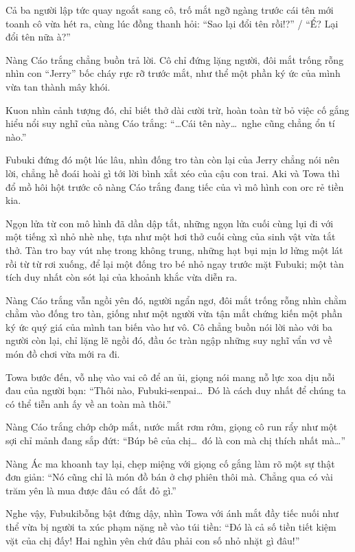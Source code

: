 \documentclass[../main.tex]{subfiles}
\begin{document}

Cả ba người lập tức quay ngoắt sang cô, trố mắt ngỡ ngàng trước cái tên mới toanh cô vừa hét ra, cùng lúc đồng thanh hỏi: ``Sao lại đổi tên rồi!?'' / ``Ể? Lại đổi tên nữa à?''

Nàng Cáo trắng chẳng buồn trả lời. Cô chỉ đứng lặng người, đôi mắt trống rỗng nhìn con ``Jerry'' bốc cháy rực rỡ trước mắt, như thể một phần ký ức của mình vừa tan thành mây khói.

Kuon nhìn cảnh tượng đó, chỉ biết thở dài cười trừ, hoàn toàn từ bỏ việc cố gắng hiểu nổi suy nghĩ của nàng Cáo trắng: ``\dots Cái tên này\dots\ nghe cũng chẳng ổn tí nào.''

Fubuki đứng đó một lúc lâu, nhìn đống tro tàn còn lại của Jerry chẳng nói nên lời, chẳng hề đoái hoài gì tới lời bình xắt xéo của cậu con trai. Aki và Towa thì đổ mồ hôi hột trước cô nàng Cáo trắng đang tiếc của vì mô hình con orc rẻ tiền kia.

\omk

Ngọn lửa từ con mô hình đã dần dập tắt, những ngọn lửa cuối cùng lụi đi với một tiếng xì nhỏ nhè nhẹ, tựa như một hơi thở cuối cùng của sinh vật vừa tắt thở. Tàn tro bay vút nhẹ trong không trung, những hạt bụi mịn lơ lửng một lát rồi từ từ rơi xuống, để lại một đống tro bé nhỏ ngay trước mặt Fubuki; một tàn tích duy nhất còn sót lại của khoảnh khắc vừa diễn ra.

Nàng Cáo trắng vẫn ngồi yên đó, người ngẩn ngơ, đôi mắt trống rỗng nhìn chằm chằm vào đống tro tàn, giống như một người vừa tận mắt chứng kiến một phần ký ức quý giá của mình tan biến vào hư vô. Cô chẳng buồn nói lời nào với ba người còn lại, chỉ lặng lẽ ngồi đó, đầu óc tràn ngập những suy nghĩ vẩn vơ về món đồ chơi vừa mới ra đi.

Towa bước đến, vỗ nhẹ vào vai cô để an ủi, giọng nói mang nỗ lực xoa dịu nỗi đau của người bạn: ``Thôi nào, Fubuki-senpai\dots\ Đó là cách duy nhất để chúng ta có thể tiễn anh ấy về an toàn mà thôi.''

Nàng Cáo trắng chớp chớp mắt, nước mắt rơm rớm, giọng cô run rẩy như một sợi chỉ mảnh đang sắp đứt: ``Búp bê của chị\dots\ đó là con mà chị thích nhất mà\dots''

Nàng Ác ma khoanh tay lại, chẹp miệng với giọng cố gắng làm rõ một sự thật đơn giản: ``Nó cũng chỉ là món đồ bán ở chợ phiên thôi mà. Chẳng qua có vài trăm yên là mua được đâu có đắt đỏ gì.''

Nghe vậy, Fubukibỗng bật đứng dậy, nhìn Towa với ánh mắt đầy tiếc nuối như thể vừa bị người ta xúc phạm nặng nề vào túi tiền: ``Đó là cả số tiền tiết kiệm vặt của chị đấy! Hai nghìn yên chứ đâu phải con số nhỏ nhặt gì đâu!''
\end{document}
